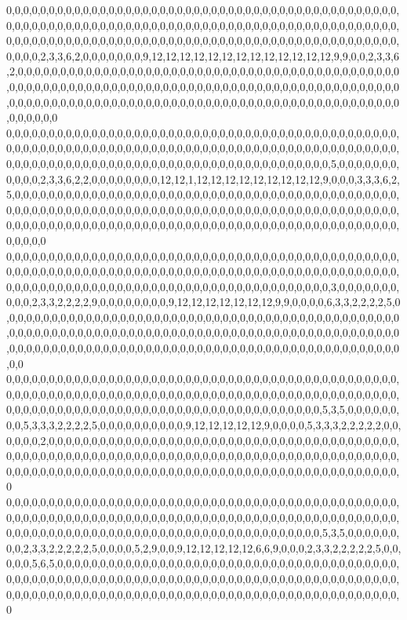 0,0,0,0,0,0,0,0,0,0,0,0,0,0,0,0,0,0,0,0,0,0,0,0,0,0,0,0,0,0,0,0,0,0,0,0,0,0,0,0,0,0,0,0,0,0,0,0,0,0,0,0,0,0,0,0,0,0,0,0,0,0,0,0,0,0,0,0,0,0,0,0,0,0,0,0,0,0,0,0,0,0,0,0,0,0,0,0,0,0,0,0,0,0,0,0,0,0,0,0,0,0,0,0,0,0,0,0,0,0,0,0,0,0,0,0,0,0,0,0,0,0,0,0,0,0,0,0,0,0,0,0,0,0,0,0,0,0,0,0,0,0,2,3,3,6,2,0,0,0,0,0,0,0,9,12,12,12,12,12,12,12,12,12,12,12,12,12,9,9,0,0,2,3,3,6,2,0,0,0,0,0,0,0,0,0,0,0,0,0,0,0,0,0,0,0,0,0,0,0,0,0,0,0,0,0,0,0,0,0,0,0,0,0,0,0,0,0,0,0,0,0,0,0,0,0,0,0,0,0,0,0,0,0,0,0,0,0,0,0,0,0,0,0,0,0,0,0,0,0,0,0,0,0,0,0,0,0,0,0,0,0,0,0,0,0,0,0,0,0,0,0,0,0,0,0,0,0,0,0,0,0,0,0,0,0,0,0,0,0,0,0,0,0,0,0,0,0,0,0,0,0,0,0,0,0,0,0,0,0,0,0,0,0,0,0,0,0,0,0
0,0,0,0,0,0,0,0,0,0,0,0,0,0,0,0,0,0,0,0,0,0,0,0,0,0,0,0,0,0,0,0,0,0,0,0,0,0,0,0,0,0,0,0,0,0,0,0,0,0,0,0,0,0,0,0,0,0,0,0,0,0,0,0,0,0,0,0,0,0,0,0,0,0,0,0,0,0,0,0,0,0,0,0,0,0,0,0,0,0,0,0,0,0,0,0,0,0,0,0,0,0,0,0,0,0,0,0,0,0,0,0,0,0,0,0,0,0,0,0,0,0,0,0,0,0,0,0,0,0,5,0,0,0,0,0,0,0,0,0,0,0,2,3,3,6,2,2,0,0,0,0,0,0,0,0,12,12,1,12,12,12,12,12,12,12,12,12,9,0,0,0,3,3,3,6,2,5,0,0,0,0,0,0,0,0,0,0,0,0,0,0,0,0,0,0,0,0,0,0,0,0,0,0,0,0,0,0,0,0,0,0,0,0,0,0,0,0,0,0,0,0,0,0,0,0,0,0,0,0,0,0,0,0,0,0,0,0,0,0,0,0,0,0,0,0,0,0,0,0,0,0,0,0,0,0,0,0,0,0,0,0,0,0,0,0,0,0,0,0,0,0,0,0,0,0,0,0,0,0,0,0,0,0,0,0,0,0,0,0,0,0,0,0,0,0,0,0,0,0,0,0,0,0,0,0,0,0,0,0,0,0,0,0,0,0,0,0,0,0
0,0,0,0,0,0,0,0,0,0,0,0,0,0,0,0,0,0,0,0,0,0,0,0,0,0,0,0,0,0,0,0,0,0,0,0,0,0,0,0,0,0,0,0,0,0,0,0,0,0,0,0,0,0,0,0,0,0,0,0,0,0,0,0,0,0,0,0,0,0,0,0,0,0,0,0,0,0,0,0,0,0,0,0,0,0,0,0,0,0,0,0,0,0,0,0,0,0,0,0,0,0,0,0,0,0,0,0,0,0,0,0,0,0,0,0,0,0,0,0,0,0,0,0,0,0,0,0,0,0,3,0,0,0,0,0,0,0,0,0,0,2,3,3,2,2,2,2,9,0,0,0,0,0,0,0,0,9,12,12,12,12,12,12,12,9,9,0,0,0,0,6,3,3,2,2,2,2,5,0,0,0,0,0,0,0,0,0,0,0,0,0,0,0,0,0,0,0,0,0,0,0,0,0,0,0,0,0,0,0,0,0,0,0,0,0,0,0,0,0,0,0,0,0,0,0,0,0,0,0,0,0,0,0,0,0,0,0,0,0,0,0,0,0,0,0,0,0,0,0,0,0,0,0,0,0,0,0,0,0,0,0,0,0,0,0,0,0,0,0,0,0,0,0,0,0,0,0,0,0,0,0,0,0,0,0,0,0,0,0,0,0,0,0,0,0,0,0,0,0,0,0,0,0,0,0,0,0,0,0,0,0,0,0,0,0,0,0,0,0
0,0,0,0,0,0,0,0,0,0,0,0,0,0,0,0,0,0,0,0,0,0,0,0,0,0,0,0,0,0,0,0,0,0,0,0,0,0,0,0,0,0,0,0,0,0,0,0,0,0,0,0,0,0,0,0,0,0,0,0,0,0,0,0,0,0,0,0,0,0,0,0,0,0,0,0,0,0,0,0,0,0,0,0,0,0,0,0,0,0,0,0,0,0,0,0,0,0,0,0,0,0,0,0,0,0,0,0,0,0,0,0,0,0,0,0,0,0,0,0,0,0,0,0,0,0,0,0,0,5,3,5,0,0,0,0,0,0,0,0,5,3,3,3,2,2,2,2,5,0,0,0,0,0,0,0,0,0,0,9,12,12,12,12,12,9,0,0,0,0,5,3,3,3,2,2,2,2,2,0,0,0,0,0,0,2,0,0,0,0,0,0,0,0,0,0,0,0,0,0,0,0,0,0,0,0,0,0,0,0,0,0,0,0,0,0,0,0,0,0,0,0,0,0,0,0,0,0,0,0,0,0,0,0,0,0,0,0,0,0,0,0,0,0,0,0,0,0,0,0,0,0,0,0,0,0,0,0,0,0,0,0,0,0,0,0,0,0,0,0,0,0,0,0,0,0,0,0,0,0,0,0,0,0,0,0,0,0,0,0,0,0,0,0,0,0,0,0,0,0,0,0,0,0,0,0,0,0,0,0,0,0,0,0,0,0,0,0,0,0
0,0,0,0,0,0,0,0,0,0,0,0,0,0,0,0,0,0,0,0,0,0,0,0,0,0,0,0,0,0,0,0,0,0,0,0,0,0,0,0,0,0,0,0,0,0,0,0,0,0,0,0,0,0,0,0,0,0,0,0,0,0,0,0,0,0,0,0,0,0,0,0,0,0,0,0,0,0,0,0,0,0,0,0,0,0,0,0,0,0,0,0,0,0,0,0,0,0,0,0,0,0,0,0,0,0,0,0,0,0,0,0,0,0,0,0,0,0,0,0,0,0,0,0,0,0,0,0,0,5,3,5,0,0,0,0,0,0,0,0,2,3,3,2,2,2,2,2,5,0,0,0,0,5,2,9,0,0,9,12,12,12,12,12,6,6,9,0,0,0,2,3,3,2,2,2,2,2,5,0,0,0,0,0,5,6,5,0,0,0,0,0,0,0,0,0,0,0,0,0,0,0,0,0,0,0,0,0,0,0,0,0,0,0,0,0,0,0,0,0,0,0,0,0,0,0,0,0,0,0,0,0,0,0,0,0,0,0,0,0,0,0,0,0,0,0,0,0,0,0,0,0,0,0,0,0,0,0,0,0,0,0,0,0,0,0,0,0,0,0,0,0,0,0,0,0,0,0,0,0,0,0,0,0,0,0,0,0,0,0,0,0,0,0,0,0,0,0,0,0,0,0,0,0,0,0,0,0,0,0,0,0,0,0,0,0,0,0,0,0
